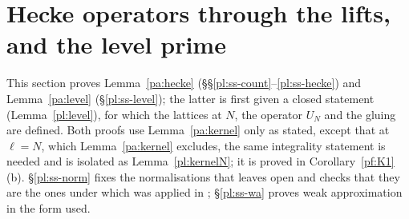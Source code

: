 \documentclass[10pt]{amsart}
\theoremstyle{definition}
\theoremstyle{remark}
\newcommand{\C}{\mathbb C}
\providecommand{\auNm}{\operatorname{Nm}}
\providecommand{\auO}{\mathcal O}
\providecommand{\auPa}{\Phi_a}
\providecommand{\auPl}{\Phi}
\providecommand{\auS}{\mathcal S}
\providecommand{\auSram}{\mathcal S^{\mathrm{ram}}}
\providecommand{\auU}{\mathrm U}
\providecommand{\aubar}[1]{\overline{#1}}
\providecommand{\auerr}{\operatorname{err}}
\providecommand{\augain}{\operatorname{gain}}
\begin{document}
\providecommand{\auO}{\mathcal O}
\providecommand{\auPl}{\Phi}
\providecommand{\auPa}{\Phi_a}
\providecommand{\auPb}{\Phi_b}
\providecommand{\auS}{\mathcal S}
\providecommand{\auSram}{\mathcal S^{\mathrm{ram}}}
\providecommand{\auDX}{D_X}
\providecommand{\augain}{\operatorname{gain}}
\providecommand{\auerr}{\operatorname{err}}
\providecommand{\auNm}{\operatorname{Nm}}
\providecommand{\auU}{\mathrm U}
\providecommand{\auGL}{\mathrm{GL}}
\providecommand{\auHom}{\operatorname{Hom}}
\providecommand{\psrho}{\varrho}
\providecommand{\psGlue}{\operatorname{Glue}}
\providecommand{\auA}{\mathbb A}
\providecommand{\auF}{\mathbb F}
\providecommand{\aucol}{\operatorname{col}}
\providecommand{\aubar}[1]{\overline{#1}}
\providecommand{\auf}[1]{\texttt{#1}}
\providecommand{\pao}{\mathfrak o}
\providecommand{\paCp}{\C_p}
\providecommand{\paI}{I_p^{\circ}}
\providecommand{\paded}{\operatorname{ded}}
\providecommand{\paPred}{\operatorname{Pred}}
\providecommand{\paloss}{\operatorname{loss}}
\providecommand{\plone}{\mathbf 1}
\providecommand{\plD}{\mathsf D}
\providecommand{\pld}{\mathsf d}
\providecommand{\ple}{\mathsf e}
\providecommand{\plP}{\mathsf P}
\providecommand{\plSi}{\Sigma_N}
\providecommand{\plMir}{\mathrm{Mir}}
\providecommand{\pldir}{\plone^{\mathrm{dir}}}
\providecommand{\plrow}{\plone^{\mathrm{row}}}
\providecommand{\plcol}{\plone^{\mathrm{col}}}
\providecommand{\pltr}{\operatorname{tr}}
\providecommand{\plvol}{\operatorname{vol}}
\providecommand{\plr}{\mathfrak r}
\providecommand{\plE}{\mathsf E}
\providecommand{\plH}{\mathcal H}
\providecommand{\plgb}[2]{\|#2\|_{#1}}

\section{Hecke operators through the lifts, and the level prime}\label{pl:sec}

This section proves Lemma~\ref{pa:hecke} (\S\S\ref{pl:ss-count}--\ref{pl:ss-hecke}) and
Lemma~\ref{pa:level} (\S\ref{pl:ss-level}); the latter is first given a closed statement
(Lemma~\ref{pl:level}), for which the lattices at $N$, the operator $U_N$ and the gluing are
defined. Both proofs use Lemma~\ref{pa:kernel} only as stated, except that at $\ell=N$, which
Lemma~\ref{pa:kernel} excludes, the same integrality statement is needed and is isolated as
Lemma~\ref{pl:kernelN}; it is proved in Corollary~\ref{pf:K1}(b). \S\ref{pl:ss-norm} fixes the normalisations that
{\cite[\S14.3]{P46}} leaves open and checks that they are the ones under which
{\cite[Theorem~2.2]{P50}} was applied in {\cite[\S2.7]{P50}}; \S\ref{pl:ss-wa} proves weak approximation
in the form used.
\end{document}
